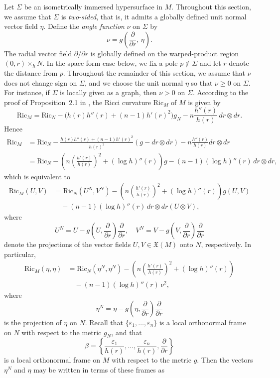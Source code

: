 \documentclass[amssymb,amstex,amsmath,11pt]{article}
\numberwithin{equation}{section}
\renewcommand{\epsilon}{\varepsilon}
\theoremstyle{plain}
\theoremstyle{definition}
\theoremstyle{remark}
\newcommand{\ddr}{\frac{\partial}{\partial r}}
\def\Ricm{\textrm{Ric}_M}
\def\Ricn{\textrm{Ric}_N}
\def\Ric{\textrm{Ric}}
\begin{document}
Let $\Sigma$ be an isometrically immersed hypersurface in $M$. Throughout this section, we assume that $\Sigma$ is \textit{two-sided}, that is, it admits a globally defined unit normal vector field $\eta$. Define the \textit{angle function} $\nu$ on $\Sigma$ by
$$
\nu=g\!\left(\frac{\partial}{\partial r},\,\eta\right).
$$
The radial vector field $\partial/\partial r$ is globally defined on the warped-product region $(0,\bar r)\times_h N$. In the space form case below, we fix a pole $p\notin\Sigma$ and let $r$ denote the distance from $p$. Throughout the remainder of this section, we  assume that $\nu$ does not change sign on $\Sigma$, and we choose the unit normal $\eta$ so that $\nu\ge 0$ on $\Sigma$. For instance, if $\Sigma$ is locally given as a graph, then $\nu>0$ on $\Sigma$. According to the proof of Proposition~2.1 in \cite{brendle13}, the Ricci curvature $\Ric_M$ of $M$ is given by
$$
\Ric_M
=
\Ric_N
-\bigl(h(r)h''(r)+(n-1)h'(r)^2\bigr)g_N
-n\frac{h''(r)}{h(r)}\,dr\otimes dr.
$$
Hence
\begin{align*}
    \Ricm & =\Ricn - \frac{h(r)h''(r)+(n-1)h'(r)^2}{h(r)^2}(g-dr\otimes dr) - n\frac{h''(r)}{h(r)}dr\otimes dr \nonumber\\
    &=\Ricn -\left(n\left(\frac{h'(r)}{h(r)}\right)^2+(\log h)''(r)\right)g - (n-1)(\log h)''(r)\,dr\otimes dr,
\end{align*}
which is equivalent to
\begin{align*}
    \Ricm(U,V)  &  = \Ricn(U^N,V^N) - \left(n\left(\frac{h'(r)}{h(r)}\right)^2+(\log h)''(r)\right)g(U,V) \\
    & \quad - (n-1)(\log h)''(r)\,dr\otimes dr(U\otimes V),
\end{align*}
where
$$
U^N = U - g\left(U,\ddr\right)\ddr, \quad
V^N = V - g\left(V,\ddr\right)\ddr
$$
denote the projections of the vector fields $U,V \in \mathfrak{X}(M)$ onto $N$, respectively. In particular,
\begin{align}
    \Ricm(\eta,\eta) &= \Ricn(\eta^N,\eta^N) - \left(n\left(\frac{h'(r)}{h(r)}\right)^2+(\log h)''(r)\right) \nonumber \\
    & \quad - (n-1)(\log h)''(r)\,\nu^2, \label{Riceta}
\end{align}
where $$\eta^N = \eta-g\left(\eta,\ddr\right)\ddr$$
is the projection of $\eta$ on $N$. Recall that $\{\epsilon_1,\ldots,\epsilon_n\}$ is a local orthonormal frame on $N$ with respect to the metric $g_N$, and that
$$
\beta=\left\{\frac{\epsilon_1}{h(r)},\ldots,\frac{\epsilon_n}{h(r)},\frac{\partial}{\partial r}\right\}
$$
is a local orthonormal frame on $M$ with respect to the metric $g$. Then the vectors $\eta^N$ and $\eta$ may be written in terms of these frames as
\end{document}
